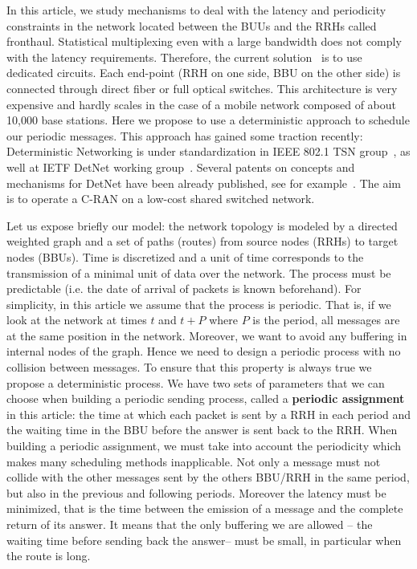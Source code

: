 \documentclass[10pt, conference, letterpaper]{IEEEtran}
\begin{document}
 In this article, we study mechanisms to deal with the latency and periodicity constraints in the network located between the BUUs and the RRHs called fronthaul.
 Statistical multiplexing even with a large bandwidth does not comply with the latency requirements. Therefore, the current solution~\cite{pizzinat2015things,tayq2017real} is to use dedicated circuits. Each end-point (RRH on one side, BBU on the other side) is connected through direct fiber or full optical switches. This architecture is very expensive and hardly scales in the case of a mobile network composed of about 10,000 base stations. Here we propose to use a deterministic approach to schedule our periodic messages. This approach has gained some traction recently: Deterministic Networking is under standardization in IEEE 802.1 TSN group~\cite{finn-detnet-architecture-08}, as well at IETF DetNet working group~\cite{ieee802}. Several patents on concepts and mechanisms for DetNet have been already published, see for example~\cite{howe2005time,leclerc2016transmission}. The aim is to operate a C-RAN on a low-cost shared switched network.
 
Let us expose briefly our model: the network topology is modeled by a directed weighted graph and a set of paths (routes) from source nodes (RRHs) to target nodes (BBUs). Time is discretized and a unit of time corresponds to the transmission of a minimal unit of data over the network. The process must be  predictable (i.e. the date of arrival of packets is known beforehand). For simplicity, in this article we assume that the process is periodic. That is, if we look at the network at times $t$ and $t+P$ where $P$ is the period, all messages are at the same position in the network. Moreover, we want to avoid any  buffering in internal nodes of the graph. Hence we need to design a periodic process with no collision between messages. To ensure that this property is always true we propose a deterministic process.  We have two sets of parameters that we can choose when building a periodic sending process, called a \textbf{periodic assignment} in this article: the time at which each packet is sent by a RRH in each period and the waiting time in the BBU before the answer is sent back to the RRH. When building a periodic assignment, we must take into account the periodicity which makes many scheduling methods inapplicable. Not only a message must not collide with the other messages sent by the others BBU/RRH in the same period, but also in the previous and following periods. Moreover the latency must be minimized, that is the time 
 between the emission of a message and the complete return of its answer. It means that the only buffering we are allowed -- the waiting time before sending back the answer-- must be small, in particular when the route is long.
   
\end{document}
